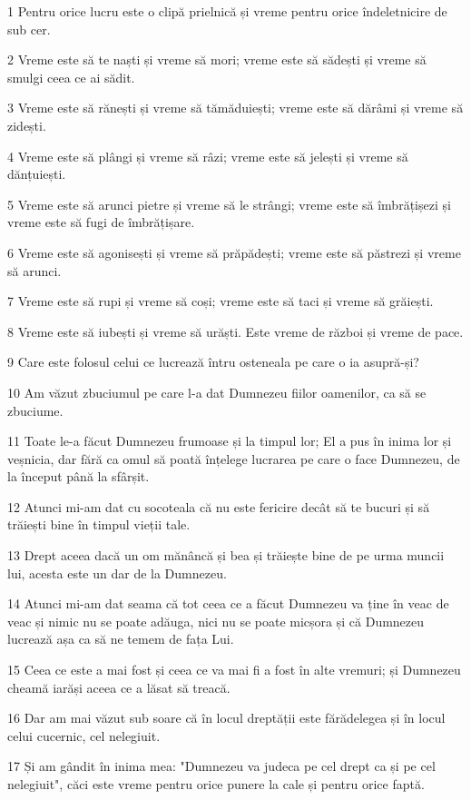 \par 1 Pentru orice lucru este o clipă prielnică și vreme pentru orice îndeletnicire de sub cer.
\par 2 Vreme este să te naști și vreme să mori; vreme este să sădești și vreme să smulgi ceea ce ai sădit.
\par 3 Vreme este să rănești și vreme să tămăduiești; vreme este să dărâmi și vreme să zidești.
\par 4 Vreme este să plângi și vreme să râzi; vreme este să jelești și vreme să dănțuiești.
\par 5 Vreme este să arunci pietre și vreme să le strângi; vreme este să îmbrățișezi și vreme este să fugi de îmbrățișare.
\par 6 Vreme este să agonisești și vreme să prăpădești; vreme este să păstrezi și vreme să arunci.
\par 7 Vreme este să rupi și vreme să coși; vreme este să taci și vreme să grăiești.
\par 8 Vreme este să iubești și vreme să urăști. Este vreme de război și vreme de pace.
\par 9 Care este folosul celui ce lucrează întru osteneala pe care o ia asupră-și?
\par 10 Am văzut zbuciumul pe care l-a dat Dumnezeu fiilor oamenilor, ca să se zbuciume.
\par 11 Toate le-a făcut Dumnezeu frumoase și la timpul lor; El a pus în inima lor și veșnicia, dar fără ca omul să poată înțelege lucrarea pe care o face Dumnezeu, de la început până la sfârșit.
\par 12 Atunci mi-am dat cu socoteala că nu este fericire decât să te bucuri și să trăiești bine în timpul vieții tale.
\par 13 Drept aceea dacă un om mănâncă și bea și trăiește bine de pe urma muncii lui, acesta este un dar de la Dumnezeu.
\par 14 Atunci mi-am dat seama că tot ceea ce a făcut Dumnezeu va ține în veac de veac și nimic nu se poate adăuga, nici nu se poate micșora și că Dumnezeu lucrează așa ca să ne temem de fața Lui.
\par 15 Ceea ce este a mai fost și ceea ce va mai fi a fost în alte vremuri; și Dumnezeu cheamă iarăși aceea ce a lăsat să treacă.
\par 16 Dar am mai văzut sub soare că în locul dreptății este fărădelegea și în locul celui cucernic, cel nelegiuit.
\par 17 Și am gândit în inima mea: "Dumnezeu va judeca pe cel drept ca și pe cel nelegiuit", căci este vreme pentru orice punere la cale și pentru orice faptă.
